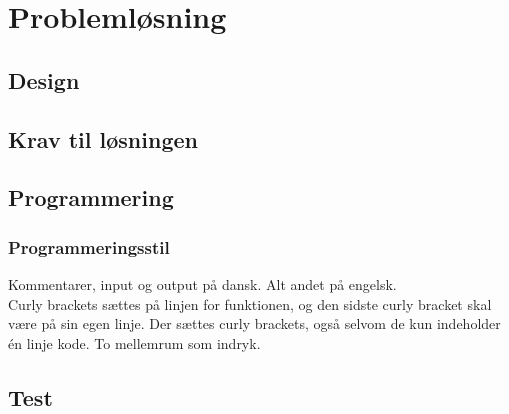 \chapter{Problemløsning}\label{ch:chlabel}

\section{Design}

\section{Krav til løsningen}

\section{Programmering}

\subsection*{Programmeringsstil}
Kommentarer, input og output på dansk. Alt andet på engelsk.\\
Curly brackets sættes på linjen for funktionen, og den sidste curly bracket skal være på sin egen linje. Der sættes curly brackets, også selvom de kun indeholder én linje kode. To mellemrum som indryk.\\

\section{Test}





